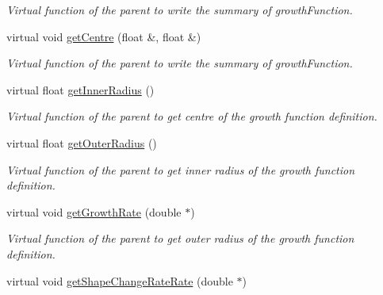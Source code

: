 \begin{DoxyCompactItemize}
\begin{DoxyCompactList}\small\item\em Virtual function of the parent to write the summary of growth\+Function. \end{DoxyCompactList}\item 
\hypertarget{classGrowthFunctionBase_a93aef4238b9da5d0b06cf18c552d3ca3}{}virtual void \hyperlink{classGrowthFunctionBase_a93aef4238b9da5d0b06cf18c552d3ca3}{get\+Centre} (float \&, float \&)\label{classGrowthFunctionBase_a93aef4238b9da5d0b06cf18c552d3ca3}

\begin{DoxyCompactList}\small\item\em Virtual function of the parent to write the summary of growth\+Function. \end{DoxyCompactList}\item 
\hypertarget{classGrowthFunctionBase_a05ace7e6cb21566ad03e72e56962d58b}{}virtual float \hyperlink{classGrowthFunctionBase_a05ace7e6cb21566ad03e72e56962d58b}{get\+Inner\+Radius} ()\label{classGrowthFunctionBase_a05ace7e6cb21566ad03e72e56962d58b}

\begin{DoxyCompactList}\small\item\em Virtual function of the parent to get centre of the growth function definition. \end{DoxyCompactList}\item 
\hypertarget{classGrowthFunctionBase_a2ba8f7659e1c0546998671458943233d}{}virtual float \hyperlink{classGrowthFunctionBase_a2ba8f7659e1c0546998671458943233d}{get\+Outer\+Radius} ()\label{classGrowthFunctionBase_a2ba8f7659e1c0546998671458943233d}

\begin{DoxyCompactList}\small\item\em Virtual function of the parent to get inner radius of the growth function definition. \end{DoxyCompactList}\item 
\hypertarget{classGrowthFunctionBase_a2c518c297bc1bbf996f6e7df758a0cc7}{}virtual void \hyperlink{classGrowthFunctionBase_a2c518c297bc1bbf996f6e7df758a0cc7}{get\+Growth\+Rate} (double $\ast$)\label{classGrowthFunctionBase_a2c518c297bc1bbf996f6e7df758a0cc7}

\begin{DoxyCompactList}\small\item\em Virtual function of the parent to get outer radius of the growth function definition. \end{DoxyCompactList}\item 
\hypertarget{classGrowthFunctionBase_aa2b72fe18b40e73b463200b7cc7f6884}{}virtual void \hyperlink{classGrowthFunctionBase_aa2b72fe18b40e73b463200b7cc7f6884}{get\+Shape\+Change\+Rate\+Rate} (double $\ast$)\label{classGrowthFunctionBase_aa2b72fe18b40e73b463200b7cc7f6884}


\end{DoxyCompactItemize}
